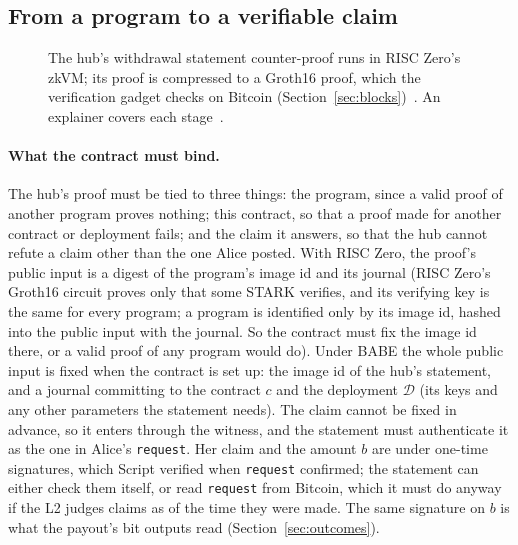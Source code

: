 \documentclass[11pt]{article}
\begin{document}
\subsection{From a program to a verifiable claim}

\begin{figure}[H]
\centering
{}
\caption{The hub's withdrawal statement counter-proof runs in RISC Zero's zkVM; its proof is
compressed to a Groth16 proof, which the verification gadget checks on
Bitcoin (Section~\ref{sec:blocks})~\cite{risc0}. An explainer covers each
stage~\cite{pipeline}.}
\end{figure}

\paragraph{What the contract must bind.} The hub's proof must be tied to
three things: the program, since a valid proof of another program proves
nothing; this contract, so that a proof made for another contract or
deployment fails; and the claim it answers, so that the hub cannot refute
a claim other than the one Alice posted. With RISC Zero, the proof's
public input is a digest of the program's image id and its journal (RISC Zero's Groth16 circuit proves only that some STARK verifies, and its
verifying key is the same for every program; a program is identified only
by its image id, hashed into the public input with the journal. So the
contract must fix the image id there, or a valid proof of any program
would do). Under BABE the whole public input is fixed
when the contract is set up: the image id of the hub's statement, and a
journal committing to the contract $c$ and the deployment $\mathcal{D}$
(its keys and any other parameters the statement needs). The claim cannot
be fixed in advance, so it enters through the witness, and the statement
must authenticate it as the one in Alice's \texttt{request}. Her claim and
the amount $b$ are under one-time signatures, which Script verified when
\texttt{request} confirmed; the statement can either check them itself, or
read \texttt{request} from Bitcoin, which it must do anyway if the L2
judges claims as of the time they were made. The same signature on $b$ is
what the payout's bit outputs read (Section~\ref{sec:outcomes}).
\end{document}
